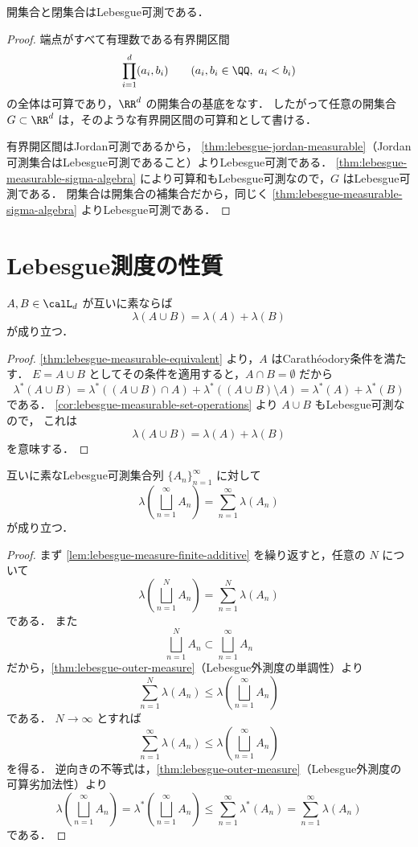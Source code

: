 \begin{theorem}[開集合と閉集合]
\label{thm:open-closed-lebesgue-measurable}
開集合と閉集合はLebesgue可測である．
\end{theorem}
\begin{proof}
端点がすべて有理数である有界開区間
\[
\prod_{i=1}^{d}(a_i,b_i)
\qquad(a_i,b_i\in\QQ,\ a_i<b_i)
\]
の全体は可算であり，$\RR^d$ の開集合の基底をなす．
したがって任意の開集合 $G\subset\RR^d$ は，そのような有界開区間の可算和として書ける．

有界開区間はJordan可測であるから，
\cref{thm:lebesgue-jordan-measurable}（Jordan可測集合はLebesgue可測であること）よりLebesgue可測である．
\cref{thm:lebesgue-measurable-sigma-algebra} により可算和もLebesgue可測なので，$G$ はLebesgue可測である．
閉集合は開集合の補集合だから，同じく \cref{thm:lebesgue-measurable-sigma-algebra} よりLebesgue可測である．
\end{proof}

\section{Lebesgue測度の性質}

\begin{lemma}[有限加法性]
\label{lem:lebesgue-measure-finite-additive}
$A,B\in\calL_d$ が互いに素ならば
\[
\lambda(A\cup B)=\lambda(A)+\lambda(B)
\]
が成り立つ．
\end{lemma}
\begin{proof}
\cref{thm:lebesgue-measurable-equivalent} より，$A$ はCarathéodory条件を満たす．
$E=A\cup B$ としてその条件を適用すると，$A\cap B=\emptyset$ だから
\[
\lambda^*(A\cup B)
=
\lambda^*((A\cup B)\cap A)+\lambda^*((A\cup B)\setminus A)
=
\lambda^*(A)+\lambda^*(B)
\]
である．
\cref{cor:lebesgue-measurable-set-operations} より $A\cup B$ もLebesgue可測なので，
これは
\[
\lambda(A\cup B)=\lambda(A)+\lambda(B)
\]
を意味する．
\end{proof}

\begin{theorem}[可算加法性]
\label{thm:lebesgue-measure-countably-additive}
互いに素なLebesgue可測集合列 $\{A_n\}_{n=1}^{\infty}$ に対して
\[
\lambda\left(\bigsqcup_{n=1}^{\infty}A_n\right)
=
\sum_{n=1}^{\infty}\lambda(A_n)
\]
が成り立つ．
\end{theorem}
\begin{proof}
まず \cref{lem:lebesgue-measure-finite-additive} を繰り返すと，任意の $N$ について
\[
\lambda\left(\bigsqcup_{n=1}^{N}A_n\right)
=
\sum_{n=1}^{N}\lambda(A_n)
\]
である．
また
\[
\bigsqcup_{n=1}^{N}A_n
\subset
\bigsqcup_{n=1}^{\infty}A_n
\]
だから，\cref{thm:lebesgue-outer-measure}（Lebesgue外測度の単調性）より
\[
\sum_{n=1}^{N}\lambda(A_n)
\le
\lambda\left(\bigsqcup_{n=1}^{\infty}A_n\right)
\]
である．
$N\to\infty$ とすれば
\[
\sum_{n=1}^{\infty}\lambda(A_n)
\le
\lambda\left(\bigsqcup_{n=1}^{\infty}A_n\right)
\]
を得る．
逆向きの不等式は，\cref{thm:lebesgue-outer-measure}（Lebesgue外測度の可算劣加法性）より
\[
\lambda\left(\bigsqcup_{n=1}^{\infty}A_n\right)
=
\lambda^*\left(\bigsqcup_{n=1}^{\infty}A_n\right)
\le
\sum_{n=1}^{\infty}\lambda^*(A_n)
=
\sum_{n=1}^{\infty}\lambda(A_n)
\]
である．
\end{proof}

